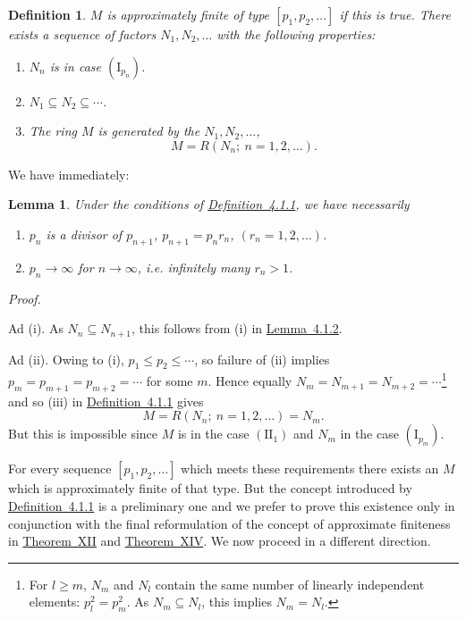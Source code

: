 \documentclass[b5paper,twoside]{article}
\newcommand{\thmref}[2]{\hyperref[#1]{\mbox{Theorem~#2}}}
\newcommand{\lemref}[2]{\hyperref[#1]{\mbox{Lemma~#2}}}
\newcommand{\defref}[2]{\hyperref[#1]{\mbox{Definition~#2}}}
\theoremstyle{mvnplain}
\newtheorem{lemma}{Lemma}[section]
\newtheorem{definition}{Definition}[section]
\renewenvironment{proof}[1][Proof]{%
  \par\addvspace{0.35\baselineskip}%
  \noindent\textit{#1.}\ \normalfont\ignorespaces
}{%
  \par\addvspace{0.35\baselineskip}%
}
\newcommand{\M}{\mathbf M}
\newcommand{\N}{\mathbf N}
\newcommand{\R}{\mathbf R}
\def\M{M}%
\def\N{N}%
\def\R{R}%
\begin{document}
\begin{definition}\label{def:4.1.1}
\(\M\) is approximately finite of type \([p_1,p_2,\ldots]\) if this is true.
There exists a sequence of factors \(\N_1,\N_2,\ldots\) with the following
properties:
\begin{enumerate}[label=\((\roman*)\)]
\item \(\N_n\) is in case \((\mathrm I_{p_n})\).
\item \(\N_1\subseteq\N_2\subseteq\cdots\).
\item The ring \(\M\) is generated by the \(\N_1,\N_2,\ldots\),
\[
  \M=\R(\N_n;\ n=1,2,\ldots).
\]
\end{enumerate}
\end{definition}

We have immediately:

\begin{lemma}\label{lem:4.1.3}
Under the conditions of \defref{def:4.1.1}{4.1.1}, we have necessarily
\begin{enumerate}[label=\((\roman*)\)]
\item \(p_n\) is a divisor of \(p_{n+1}\),
\(p_{n+1}=p_nr_n\), \((r_n=1,2,\ldots)\).
\item \(p_n\to\infty\) for \(n\to\infty\), i.e. infinitely many
\(r_n>1\).
\end{enumerate}
\end{lemma}

\begin{proof}
Ad (i). As \(\N_n\subseteq\N_{n+1}\), this follows from (i) in
\lemref{lem:4.1.2}{4.1.2}.

Ad (ii). Owing to (i), \(p_1\le p_2\le\cdots\), so failure of (ii) implies
\(p_m=p_{m+1}=p_{m+2}=\cdots\) for some \(m\). Hence equally
\(\N_m=\N_{m+1}=\N_{m+2}=\cdots\)\footnote{For \(l\ge m\), \(\N_m\) and
\(\N_l\) contain the same number of linearly independent elements:
\(p_l^2=p_m^2\). As \(\N_m\subseteq\N_l\), this implies
\(\N_m=\N_l\).} and so (iii) in \defref{def:4.1.1}{4.1.1} gives
\[
  \M=\R(\N_n;\ n=1,2,\ldots)=\N_m.
\]
But this is impossible since \(\M\) is in the case \((\mathrm {II}_1)\) and
\(\N_m\) in the case \((\mathrm I_{p_m})\).
\end{proof}

For every sequence \([p_1,p_2,\ldots]\) which meets these requirements there
exists an \(\M\) which is approximately finite of that type. But the concept
introduced by \defref{def:4.1.1}{4.1.1} is a preliminary one and we prefer to
prove this existence only in conjunction with the final reformulation of the
concept of approximate finiteness in \thmref{thm:XII}{XII} and
\thmref{thm:XIV}{XIV}. We now proceed in a different direction.
\end{document}

